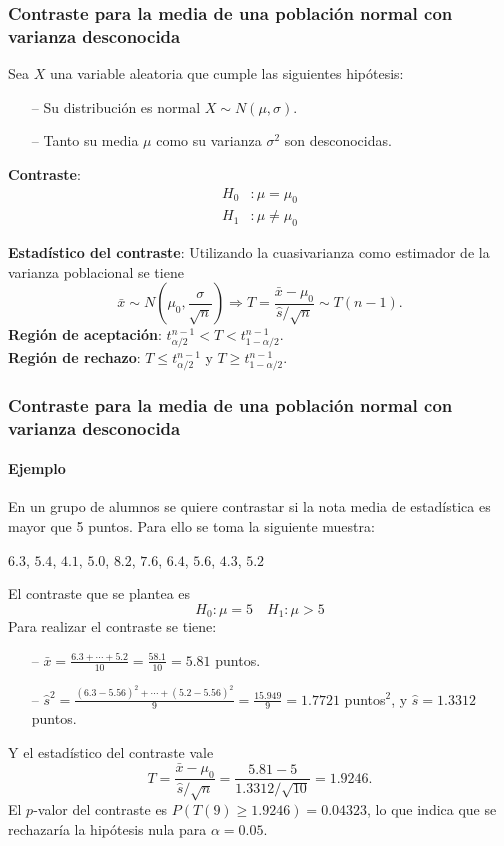 \begin{frame}
\frametitle{Contraste para la media de una población normal con varianza desconocida}
Sea $X$ una variable aleatoria que cumple las siguientes hipótesis:
\begin{itemize}
\item[--] Su distribución es normal $X\sim N(\mu,\sigma)$.
\item[--] Tanto su media $\mu$ como su varianza $\sigma^2$ son desconocidas.
\end{itemize}

\textbf{Contraste}:
\begin{align*} 
H_0 &: \mu=\mu_0\\
H_1 &: \mu\neq \mu_0
\end{align*}

\textbf{Estadístico del contraste}: Utilizando la cuasivarianza como estimador de la varianza poblacional se tiene
\[
\bar x\sim N\left(\mu_0,\frac{\sigma}{\sqrt{n}}\right) \Rightarrow T=\frac{\bar x-\mu_0}{\hat s/\sqrt{n}}\sim T(n-1).
\]
\textbf{Región de aceptación}: $t^{n-1}_{\alpha/2}< T < t^{n-1}_{1-\alpha/2}$.\\
\textbf{Región de rechazo}: $T\leq t^{n-1}_{\alpha/2}$ y $T\geq t^{n-1}_{1-\alpha/2}$.
\end{frame}


\begin{frame}
\frametitle{Contraste para la media de una población normal con varianza desconocida}
\framesubtitle{Ejemplo}
En un grupo de alumnos se quiere contrastar si la nota media de estadística es mayor que 5 puntos.
Para ello se toma la siguiente muestra:
\begin{center}
$6.3$, $5.4$, $4.1$, $5.0$, $8.2$, $7.6$, $6.4$, $5.6$, $4.3$, $5.2$
\end{center} 
El contraste que se plantea es
\[
H_0: \mu=5 \quad H_1: \mu>5
\]
Para realizar el contraste se tiene:
\begin{itemize}
\item[--] $\bar x = \frac{6.3+\cdots+5.2}{10}=\frac{58.1}{10}=5.81$ puntos.
\item[--] $\hat s^2 = \frac{(6.3-5.56)^2+\cdots+(5.2-5.56)^2}{9} = \frac{15.949}{9}=1.7721$ puntos$^2$, y $\hat s
=1.3312$ puntos.
\end{itemize}
Y el estadístico del contraste vale
\[
T=\frac{\bar x-\mu_0}{\hat s/\sqrt{n}} = \frac{5.81-5}{1.3312/\sqrt{10}}= 1.9246.
\]
El $p$-valor del contraste es $P(T(9)\geq 1.9246) = 0.04323$, lo que indica que se rechazaría la hipótesis nula para
$\alpha=0.05$.
\end{frame}


